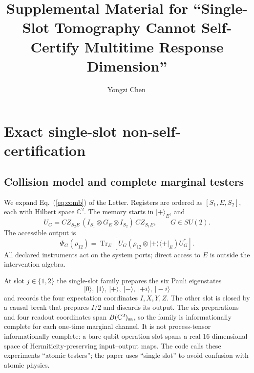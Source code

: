 \documentclass[aps,prl,onecolumn,superscriptaddress,nofootinbib]{revtex4-2}
\newcommand{\C}{\mathbb C}
\newcommand{\Tr}{\operatorname{Tr}}
\begin{document}
\title{Supplemental Material for ``Single-Slot Tomography Cannot Self-Certify Multitime Response Dimension''}
\author{Yongzi Chen\,}
\maketitle

\section{Exact single-slot non-self-certification}
\label{sec:single-slot}

\subsection{Collision model and complete marginal testers}

We expand Eq.~(\ref{eq:comb}) of the Letter.  Registers are ordered as
$[S_1,E,S_2]$, each with Hilbert space $\C^2$.  The memory starts in
$|+\rangle_E$, and
\begin{equation}
 U_G=CZ_{S_2E}\,(I_{S_1}\otimes G_E\otimes I_{S_2})\,CZ_{S_1E},
 \qquad G\in SU(2).
 \label{eq:UG}
\end{equation}
The accessible output is
\begin{equation}
 \Phi_G(\rho_{12})=\Tr_E\!\left[U_G
 (\rho_{12}\otimes |+\rangle\!\langle+|_E)U_G^*\right].
 \label{eq:PhiG}
\end{equation}
All declared instruments act on the system ports; direct access to $E$ is outside the intervention algebra.

At slot $j\in\{1,2\}$ the single-slot family prepares the six Pauli eigenstates
\begin{equation}
 |0\rangle,\ |1\rangle,\ |+\rangle,\ |-\rangle,\ |+i\rangle,\ |-i\rangle
 \label{eq:sixpreps}
\end{equation}
and records the four expectation coordinates $I,X,Y,Z$.  The other slot is closed by a causal break that prepares $I/2$ and discards its output.  The six preparations and four readout coordinates span $B(\C^2)_{\rm sa}$, so the family is informationally complete for each one-time marginal channel.  It is not process-tensor informationally complete: a bare qubit operation slot spans a real 16-dimensional space of Hermiticity-preserving input--output maps.  The code calls these experiments ``atomic testers''; the paper uses ``single slot'' to avoid confusion with atomic physics.
\end{document}
